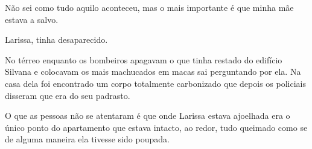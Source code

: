 Não sei como tudo aquilo aconteceu, mas o mais importante é que minha mãe estava a salvo.

Larissa, tinha desaparecido.

No térreo enquanto os bombeiros apagavam o que tinha restado do edifício Silvana e colocavam os mais machucados em macas sai perguntando por ela. Na casa dela foi encontrado um corpo totalmente carbonizado que depois os policiais disseram que era do seu padrasto.

O que as pessoas não se atentaram é que onde Larissa estava ajoelhada era o único ponto do apartamento que estava intacto, ao redor, tudo queimado como se de alguma maneira ela tivesse sido poupada.




